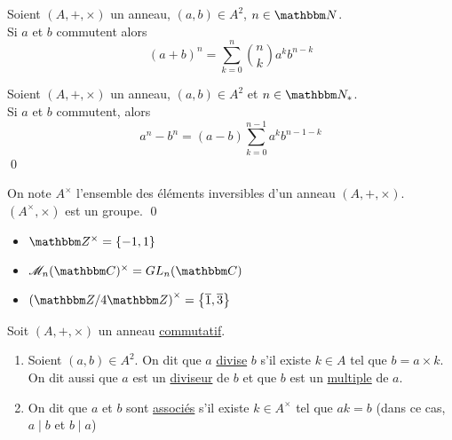 \begin{thm}
	Soient $(A,+,\times)$ un anneau, $(a,b) \in A^2$, $n \in \N$.\\
	Si $a$ et $b$ commutent alors \[
		(a + b)^n = \sum_{k=0}^n {n \choose k} a^k b^{n-k}
	\]
\end{thm}

\begin{prv}
\end{prv}

\begin{prop}
	Soient $(A,+,\times)$ un anneau, $(a,b) \in A^2$ et $n \in \N_*$.\\
	Si $a$ et $b$ commutent, alors \[
		a^n - b^n = (a-b) \sum_{k=0}^{n-1} a^kb^{n-1-k}
	\] \qed
\end{prop}

\begin{prop}
	On note $A^\times$ l'ensemble des éléments inversibles d'un anneau $(A,+,\times)$.\\
	$(A^\times,\times)$ est un groupe.
	\qed
\end{prop}

\begin{exm}
	\begin{itemize}
		\item $\Z^\times = \{-1,1\}$ 
		\item $\mathcal{M}_n(\C)^\times = GL_n(\C)$ 
		\item $\left( \Z / 4\Z \right) ^\times = \left\{ \overline{1}, \overline{3} \right\}$
	\end{itemize}
\end{exm}

\begin{defn}
	Soit $(A,+,\times)$ un anneau \underline{commutatif}.
	\begin{enumerate}
		\item Soient $(a,b) \in A^2$. On dit que $a$ \underline{divise} $b$ s'il existe $k \in A$ tel que $b = a\times k$. On dit aussi que $a$ est un \underline{diviseur} de $b$ et que $b$ est un \underline{multiple} de $a$.
		\item On dit que $a$ et $b$ sont \underline{associés} s'il existe $k \in A^\times$ tel que $ak = b$ (dans ce cas, $a \mid b$ et $b \mid a$)
	\end{enumerate}
\end{defn}

